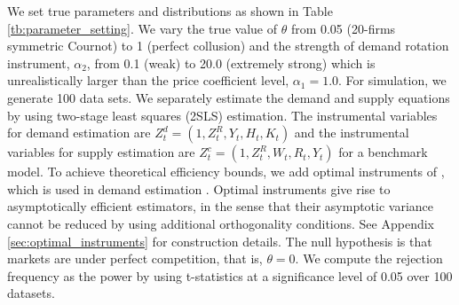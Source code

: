 \documentclass[11pt, a4paper]{article}
\begin{document}
We set true parameters and distributions as shown in Table \ref{tb:parameter_setting}. 
We vary the true value of $\theta$ from 0.05 (20-firms symmetric Cournot) to 1 (perfect collusion) and the strength of demand rotation instrument, $\alpha_2$, from 0.1 (weak) to 20.0 (extremely strong) which is unrealistically larger than the price coefficient level, $\alpha_1=1.0$.
For simulation, we generate 100 data sets.
We separately estimate the demand and supply equations by using two-stage least squares (2SLS) estimation.
The instrumental variables for demand estimation are $Z^{d}_{t} = (1, Z^{R}_{t}, Y_{t}, H_{t}, K_{t})$ and the instrumental variables for supply estimation are $Z^{c}_{t} = (1, Z^{R}_{t}, W_{t}, R_{t}, Y_{t})$ for a benchmark model. 
To achieve theoretical efficiency bounds, we add optimal instruments of \cite{chamberlain1987asymptotic}, which is used in demand estimation \citep{reynaert2014improving}. 
Optimal instruments give rise to asymptotically efficient estimators, in the sense that their asymptotic variance cannot be reduced by using additional orthogonality conditions.
See Appendix \ref{sec:optimal_instruments} for construction details.
The null hypothesis is that markets are under perfect competition, that is, $\theta=0$.
We compute the rejection
frequency as the power by using t-statistics at a significance level of 0.05 over 100 datasets.
\end{document}
